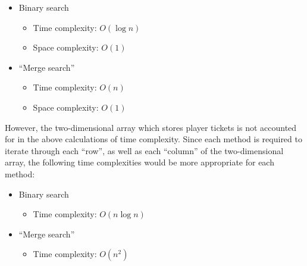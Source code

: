 \begin{itemize}
\item Binary search
	\begin{itemize}
	\item Time complexity: $O(\log n)$
	\item Space complexity: $O(1)$
	\end{itemize}
\item ``Merge search''
	\begin{itemize}
	\item Time complexity: $O(n)$
	\item Space complexity: $O(1)$
	\end{itemize}
\end{itemize}

\noindent
However, the two-dimensional array which stores player tickets is not accounted for in the above calculations of time complexity. Since each method is required to iterate through each ``row'', as well as each ``column'' of the two-dimensional array, the following time complexities would be more appropriate for each method:

\begin{itemize}
\item Binary search
	\begin{itemize}
	\item Time complexity: $O(n \log n)$
	\end{itemize}
\item ``Merge search''
	\begin{itemize}
	\item Time complexity: $O(n^2)$
	\end{itemize}
\end{itemize}